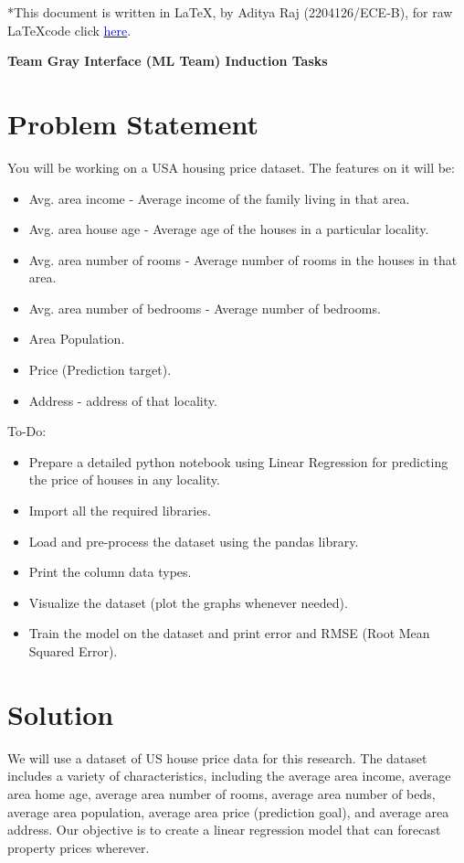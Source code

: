 \documentclass{article}
\begin{document}
*This document is written in \LaTeX, by Aditya Raj (2204126/ECE-B), for raw \LaTeX code click \href{}{\textcolor{blue}{here}}.
\begin{center}
\textbf{\Large Team Gray Interface (ML Team) Induction Tasks}
\end{center}
\section{Problem Statement}

You will be working on a USA housing price dataset. The features on it will be:

\begin{itemize}
\item Avg. area income - Average income of the family living in that area.
\item Avg. area house age - Average age of the houses in a particular locality.
\item Avg. area number of rooms - Average number of rooms in the houses in that area.
\item Avg. area number of bedrooms - Average number of bedrooms.
\item Area Population.
\item Price (Prediction target).
\item Address - address of that locality.
\end{itemize}
To-Do:
\begin{itemize}
\item Prepare a detailed python notebook using Linear Regression for predicting the price of houses in any locality.
\item Import all the required libraries.
\item Load and pre-process the dataset using the pandas library.
\item Print the column data types.
\item Visualize the dataset (plot the graphs whenever needed).
\item Train the model on the dataset and print error and RMSE (Root Mean Squared Error).
\end{itemize}
\vspace{12\baselineskip}
\section{Solution}
We will use a dataset of US house price data for this research. The dataset includes a variety of characteristics, including the average area income, average area home age, average area number of rooms, average area number of beds, average area population, average area price (prediction goal), and average area address. Our objective is to create a linear regression model that can forecast property prices wherever.
\end{document}
